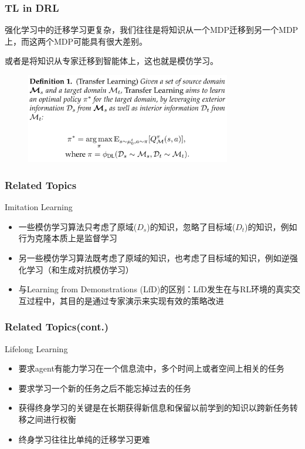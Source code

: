 \documentclass[aspectratio=169]{beamer}
\begin{document}
\begin{frame}
  \frametitle{TL in DRL}
  强化学习中的迁移学习更复杂，我们往往是将知识从一个MDP迁移到另一个MDP上，而这两个MDP可能具有很大差别。

  或者是将知识从专家迁移到智能体上，这也就是模仿学习。

  \begin{figure}
    \centering
    \includegraphics[width=0.8\textwidth]{imgs/TL_in_DRL_definition.png}
  \end{figure}
\end{frame}

\begin{frame}
  \frametitle{Related Topics}
  Imitation Learning
  \begin{itemize}
    \item  一些模仿学习算法只考虑了原域($D_s$)的知识，忽略了目标域($D_t$)的知识，例如行为克隆本质上是监督学习
    \item 另一些模仿学习算法既考虑了原域的知识，也考虑了目标域的知识，例如逆强化学习（和生成对抗模仿学习）
    \item 与Learning from Demonstrations (LfD)的区别：LfD发生在与RL环境的真实交互过程中，其目的是通过专家演示来实现有效的策略改进
  \end{itemize}
\end{frame}

\begin{frame}
  \frametitle{Related Topics(cont.)}
  Lifelong Learning
  \begin{itemize}
    \item  要求agent有能力学习在一个信息流中，多个时间上或者空间上相关的任务
    \item 要求学习一个新的任务之后不能忘掉过去的任务
    \item 获得终身学习的关键是在长期获得新信息和保留以前学到的知识以跨新任务转移之间进行权衡
    \item 终身学习往往比单纯的迁移学习更难
  \end{itemize}
\end{frame}
\end{document}
